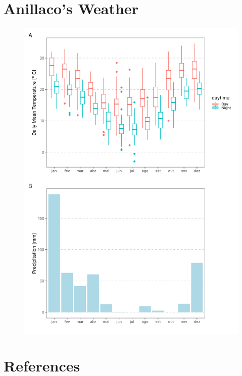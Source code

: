 \documentclass[msc,numbers,hidelinks]{coppe}
\begin{document}
  \hypertarget{anillacos-weather}{%
  \chapter{Anillaco's Weather}\label{anillacos-weather}}
  \begin{figure}
  \includegraphics[width=1\linewidth]{../04_figures/weather/weather} \end{figure}

  \backmatter
  
  

  \hypertarget{references}{%
  \chapter*{References}\label{references}}
\end{document}
